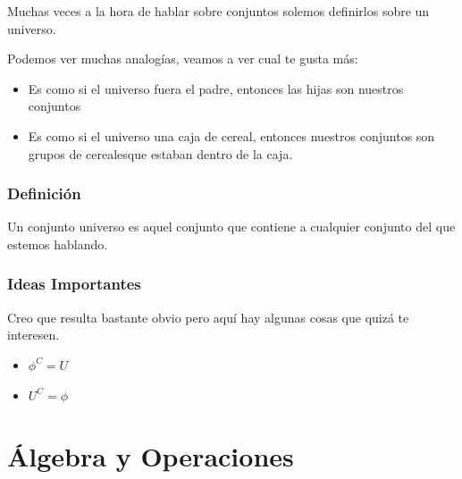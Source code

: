 \documentclass[12pt, fleqn]{report}                             %
\theoremstyle{break}                                            %
\begin{document}
            Muchas veces a la hora de hablar sobre conjuntos solemos definirlos sobre un universo.

            Podemos ver muchas analogías, veamos a ver cual te gusta más:

            \begin{itemize}
                \item Es como si el universo fuera el padre, entonces las hijas son nuestros conjuntos
                \item Es como si el universo una caja de cereal, entonces nuestros conjuntos son grupos
                    de cerealesque estaban dentro de la caja.
            \end{itemize}


            \subsection{Definición}
                Un conjunto universo es aquel conjunto que contiene a cualquier conjunto del que estemos
                hablando.


            \subsection{Ideas Importantes}
                Creo que resulta bastante obvio pero aquí hay algunas cosas que quizá te interesen.
                \begin{itemize}
                    \item $\phi^C = U$
                    \item $U^C = \phi$
                \end{itemize}







    \chapter{Álgebra y Operaciones}
        \clearpage
\end{document}
